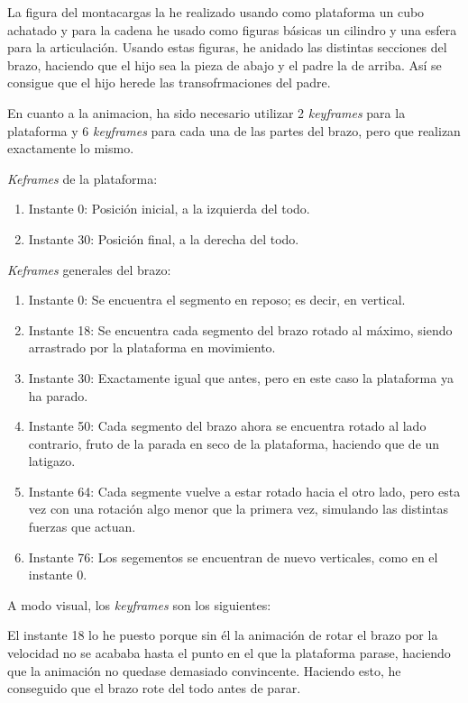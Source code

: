 \documentclass{article}
\begin{document}
La figura del montacargas la he realizado usando como plataforma un cubo achatado y para la cadena he usado como figuras básicas un cilindro y una esfera para la articulación. Usando estas figuras, he anidado las distintas secciones del brazo, haciendo que el hijo sea la pieza de abajo y el padre la de arriba. Así se consigue que el hijo herede las transofrmaciones del padre.



En cuanto a la animacion, ha sido necesario utilizar 2 \textit{keyframes} para la plataforma y 6 \textit{keyframes} para cada una de las partes del brazo, pero que realizan exactamente lo mismo. 

\textit{Keframes} de la plataforma:


\begin{enumerate}
    \item Instante 0: Posición inicial, a la izquierda del todo.
    \item Instante 30: Posición final, a la derecha del todo.
\end{enumerate}

\textit{Keframes} generales del brazo:

\begin{enumerate}
    \item Instante 0: Se encuentra el segmento en reposo; es decir, en vertical.
    \item Instante 18: Se encuentra cada segmento del brazo rotado al máximo, siendo arrastrado por la plataforma en movimiento.
    \item Instante 30: Exactamente igual que antes, pero en este caso la plataforma ya ha parado.
    \item Instante 50: Cada segmento del brazo ahora se encuentra rotado al lado contrario, fruto de la parada en seco de la plataforma, haciendo que de un latigazo.
    \item Instante 64: Cada segmente vuelve a estar rotado hacia el otro lado, pero esta vez con una rotación algo menor que la primera vez, simulando las distintas fuerzas que actuan.
    \item Instante 76: Los segementos se encuentran de nuevo verticales, como en el instante 0.
\end{enumerate}

A modo visual, los \textit{keyframes} son los siguientes:

El instante 18 lo he puesto porque sin él la animación de rotar el brazo por la velocidad no se acababa hasta el punto en el que la plataforma parase, haciendo que la animación no quedase demasiado convincente. Haciendo esto, he conseguido que el brazo rote del todo antes de parar.
\end{document}

